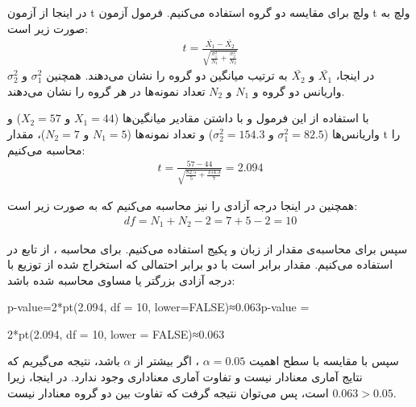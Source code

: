 در اینجا از آزمون t ولچ برای مقایسه دو گروه استفاده می‌کنیم. فرمول آزمون t ولچ به صورت زیر است:
\begin{gather*}
	t = \frac{\bar{X_1} - \bar{X_2}}{\sqrt{\frac{\sigma_1^2}{N_1} + \frac{\sigma_2^2}{N_2}}}
\end{gather*}
در اینجا، $\bar{X_1}$ و $\bar{X_2}$ به ترتیب میانگین دو گروه را نشان می‌دهند. همچنین $\sigma_1^2$ و $\sigma_2^2$ واریانس دو گروه و $N_1$ و $N_2$ تعداد نمونه‌ها در هر گروه را نشان می‌دهند.

با استفاده از این فرمول و با داشتن مقادیر میانگین‌ها ($X_1 = 44$ و $X_2 = 57$) و واریانس‌ها ($\sigma_1^2 = 82.5$ و $\sigma_2^2 = 154.3$) و تعداد نمونه‌ها ($N_1 = 5$ و $N_2 = 7$)، مقدار t را محاسبه می‌کنیم:
\begin{gather*}
	t = \frac{57 - 44}{\sqrt{\frac{82.5}{5} + \frac{154.3}{7}}} = 2.094
\end{gather*}

همچنین در اینجا درجه آزادی
را نیز محاسبه می‌کنیم که به صورت زیر است:
\begin{gather*}
	df = N_1 + N_2 - 2 = 7 + 5 - 2 = 10
\end{gather*}

سپس برای محاسبه‌ی مقدار
از زبان
و پکیج
استفاده می‌کنیم. برای محاسبه
، از تابع
در
استفاده می‌کنیم. مقدار
برابر است با دو برابر احتمالی که
استخراج شده از توزیع
با درجه آزادی
بزرگتر یا مساوی
محاسبه شده باشد:
\begin{latin}
	p-value=2*pt(2.094, df = 10, lower=FALSE)≈0.063p-value =
\end{latin}

\begin{latin}
2*pt(2.094, df = 10, lower = FALSE)≈0.063
\end{latin}

سپس با مقایسه
با سطح اهمیت
$\alpha = 0.05$
، اگر
بیشتر از 
$\alpha$
باشد، نتیجه می‌گیریم که نتایج آماری معنادار نیست و تفاوت آماری معناداری وجود ندارد. در اینجا، زیرا
$0.063 > 0.05$ 
است، پس می‌توان نتیجه گرفت که تفاوت بین دو گروه معنادار نیست.